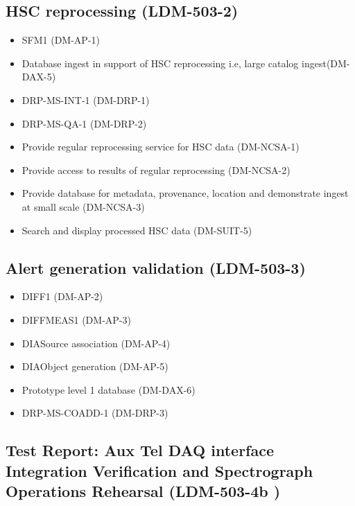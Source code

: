 \subsection{HSC reprocessing \textbf{(LDM-503-2)}\label{LDM-503-2}}

\begin{itemize}
\item SFM1 (DM-AP-1)
\item Database ingest in support of HSC reprocessing i.e, large catalog ingest(DM-DAX-5)
\item DRP-MS-INT-1 (DM-DRP-1)
\item DRP-MS-QA-1 (DM-DRP-2)
\item Provide regular reprocessing service for HSC data (DM-NCSA-1)
\item Provide access to results of regular reprocessing (DM-NCSA-2)
\item Provide database for metadata, provenance, location and demonstrate ingest at small scale (DM-NCSA-3)
\item Search and display processed HSC data (DM-SUIT-5)
\end{itemize}
\subsection{Alert generation validation \textbf{(LDM-503-3)}\label{LDM-503-3}}

\begin{itemize}
\item DIFF1		(DM-AP-2)
\item DIFFMEAS1		(DM-AP-3)
\item DIASource association		(DM-AP-4)
\item DIAObject generation		(DM-AP-5)
\item Prototype level 1 database		(DM-DAX-6)
\item DRP-MS-COADD-1		(DM-DRP-3)

\end{itemize}

\subsection{Test Report: Aux Tel DAQ interface Integration Verification and Spectrograph Operations Rehearsal \textbf{(LDM-503-4b )}\label{LDM-503-4b }}

